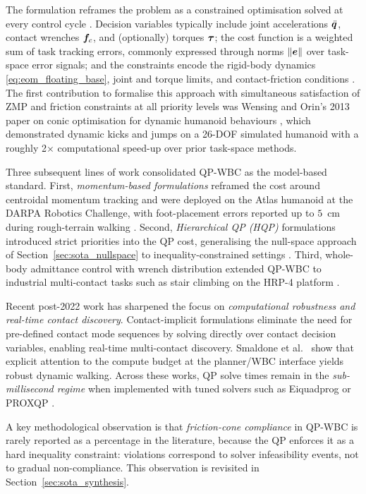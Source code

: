 The \QP{} formulation reframes the \WBC{} problem as a constrained
optimisation solved at every control cycle \cite{Wensing2013}. Decision
variables typically include joint accelerations $\ddot{\bm{q}}$, contact wrenches
$\bm{f}_c$, and (optionally) torques $\bm{\tau}$; the cost function is a
weighted sum of task tracking errors, commonly expressed through norms
$\left\lVert\bm{e}\right\rVert$ over task-space error signals; and the constraints
encode the rigid-body dynamics \eqref{eq:eom_floating_base}, joint and
torque limits, and contact-friction conditions
\cite{Wensing2013,Koolen2016}. The first contribution to formalise this
approach with simultaneous satisfaction of ZMP and friction constraints
at all priority levels was Wensing and Orin's 2013 paper on conic
optimisation for dynamic humanoid behaviours \cite{Wensing2013}, which
demonstrated dynamic kicks and jumps on a 26-DOF simulated humanoid with
a roughly 2$\times$ computational speed-up over prior task-space methods.

Three subsequent lines of work consolidated QP-WBC as the model-based
standard. First, \emph{momentum-based formulations} \cite{Koolen2016}
reframed the cost around centroidal momentum tracking and were deployed
on the Atlas humanoid at the DARPA Robotics Challenge, with foot-placement
errors reported up to $5$~cm during rough-terrain walking \cite{Koolen2016}.
Second, \emph{Hierarchical QP (HQP)} formulations introduced strict
priorities into the QP cost, generalising the null-space approach of
Section~\ref{sec:sota_nullspace} to inequality-constrained settings
\cite{EscandeMansard2014}. Third, whole-body admittance control with
\QP{} wrench distribution extended QP-WBC to industrial multi-contact
tasks such as stair climbing on the HRP-4 platform \cite{Caron2019}.

Recent post-2022 work has sharpened the focus on \emph{computational
robustness and real-time contact discovery}. Contact-implicit \MPC{} formulations
\cite{LeCleach2024,Kim2025CI} eliminate the need for pre-defined contact
mode sequences by solving directly over contact decision variables, enabling
real-time multi-contact discovery. Smaldone et al.\
\cite{Smaldone2025} show that explicit attention to the compute budget
at the planner/WBC interface yields robust dynamic walking. Across these
works, QP solve times remain in the \emph{sub-millisecond regime} when
implemented with tuned solvers such as Eiquadprog or PROXQP \cite{DelPrete2016,Wensing2023Review}.

A key methodological observation is that \emph{friction-cone compliance}
in QP-WBC is rarely reported as a percentage in the literature, because
the QP enforces it as a hard inequality constraint: violations correspond
to solver infeasibility events, not to gradual non-compliance. This
observation is revisited in Section~\ref{sec:sota_synthesis}.

